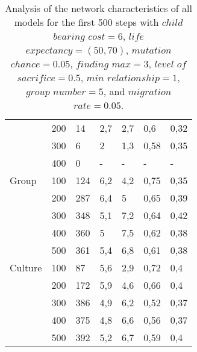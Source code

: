 \begin{table}[]
\begin{tabular}{@{}lllllll@{}}
                   & 200  & 14    & 2,7                       & 2,7                       & 0,6                       & 0,32          \\
                   & 300  & 6     & 2                         & 1,3                       & 0,58                      & 0,35          \\
                   & 400  & 0     & -                         & -                         & -                         & -             \\\midrule
        Group      & 100  & 124   & 6,2                       & 4,2                       & 0,75                      & 0,35          \\
                   & 200  & 287   & 6,4                       & 5                         & 0,65                      & 0,39          \\
                   & 300  & 348   & 5,1                       & 7,2                       & 0,64                      & 0,42          \\
                   & 400  & 360   & 5                         & 7,5                       & 0,62                      & 0,38          \\
                   & 500  & 361   & 5,4                       & 6,8                       & 0,61                      & 0,38          \\\midrule
        Culture    & 100  & 87    & 5,6                       & 2,9                       & 0,72                      & 0,4           \\
                   & 200  & 172   & 5,9                       & 4,6                       & 0,66                      & 0,4           \\
                   & 300  & 386   & 4,9                       & 6,2                       & 0,52                      & 0,37          \\
                   & 400  & 375   & 4,8                       & 6,6                       & 0,56                      & 0,37          \\
                   & 500  & 392   & 5,2                       & 6,7                       & 0,59                      & 0,4           \\ \bottomrule
    \end{tabular}
    \caption[Analysis of the network characteristics of all models]{Analysis of the network characteristics of all models for the first 500 steps with $child$ $bearing$ $cost = 6$, $life$ $expectancy = (50,70)$, $mutation$ $chance = 0.05$, $finding$ $max = 3$, $level$ $of$ $sacrifice = 0.5$, $min$ $relationship = 1$, $group$ $number = 5$, and $migration$ $rate = 0.05$. }
\end{table}